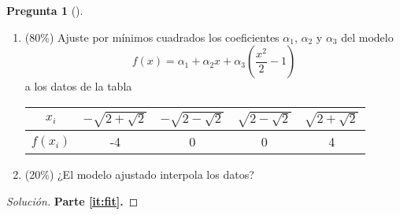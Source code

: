 \documentclass[letter,12pt]{article}
\theoremstyle{definition}
\newtheorem{question}{Pregunta}
\numberwithin{equation}{question}
\newenvironment{solution}{\begin{proof}[Solución]}{\end{proof}}
\begin{document}
\newpage
\begin{question}[]\hfill
\begin{enumerate}
\item\label{it:fit} (80\%) Ajuste por mínimos cuadrados los coeficientes $\alpha_1$, $\alpha_2$ y $\alpha_3$ del modelo
%
\begin{equation*}
f(x) = \alpha_1 + \alpha_2 x + \alpha_3 \left(\frac{x^2}{2} - 1\right)
\end{equation*}
%
a los datos de la tabla
%
\begin{center}
\begin{tabular}{c|cccc}
$x_i$ & $-\sqrt{2+\sqrt{2}}$ & $-\sqrt{2-\sqrt{2}}$ & $\sqrt{2-\sqrt{2}}$ & $\sqrt{2+\sqrt{2}}$\\\hline
$f(x_i)$ & -4 & 0 & 0 & 4
\end{tabular}
\end{center}
\item\label{it:assess} (20\%) ¿El modelo ajustado interpola los datos?
\end{enumerate}

\begin{solution}
\textbf{Parte \ref{it:fit}.}


\end{solution}
\end{question}
\end{document}
